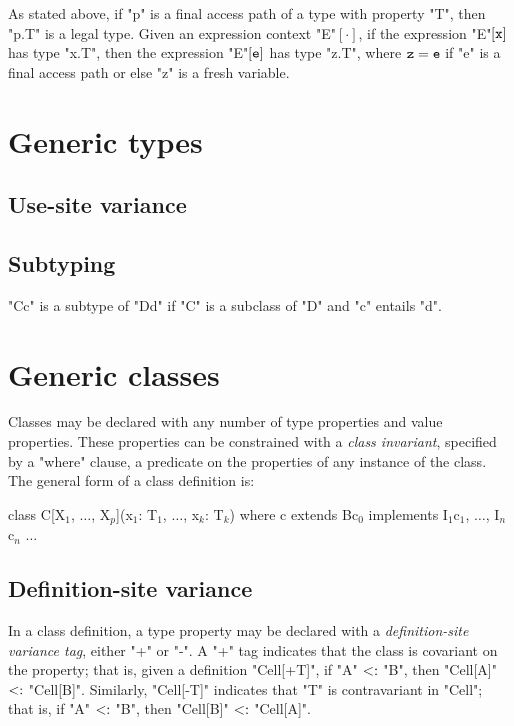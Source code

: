 \documentclass[nocopyrightspace,9pt]{sigplanconf}
\begin{document}
As stated above, if \xcd"p" is a final access path of a
type with property \xcd"T", then \xcd"p.T" is a legal type.
Given an expression context \xcd"E"$[\cdot]$, if
the expression \xcd"E"$[{\tt x}]$ has type \xcd"x.T",
then the expression \xcd"E"$[{\tt e}]$ has type \xcd"z.T",
where ${\tt z} = {\tt e}$ if \xcd"e" is a final access path
or else \xcd"z" is a fresh variable.
\fi

\section{Generic types}

\subsection{Use-site variance}

\subsection{Subtyping}

\xcd"C{c}" is a subtype of \xcd"D{d}" if \xcd"C" is a subclass
of \xcd"D" and \xcd"c" entails \xcd"d".

\section{Generic classes}

Classes may be declared with any number of type properties and
value properties.  These properties can be constrained with a
\emph{class invariant}, specified by a \xcd"where" clause,
a predicate on the properties of any instance of the class.
%
The general form of a class definition is:
\begin{xtenmath}
class C[X$_1$, $\dots$, X$_p$](x$_1$: T$_1$, $\dots$, x$_k$: T$_k$)
      where c
      extends B{c$_0$}
      implements I$_1${c$_1$}, $\dots$, I$_n${c$_n$} {$\dots$}
\end{xtenmath}

\subsection{Definition-site variance}

In a class definition, 
a type property may be declared with a \emph{definition-site variance tag}, either \xcd"+" or
\xcd"-".  A \xcd"+" tag indicates that the class is covariant on
the property; that is, given a definition
\xcd"Cell[+T]",
if \xcd"A" $\subtype$ \xcd"B", then
\xcd"Cell[A]" $\subtype$ \xcd"Cell[B]".
Similarly,
\xcd"Cell[-T]" indicates that \xcd"T" is contravariant in \xcd"Cell";
that is, if \xcd"A" $\subtype$ \xcd"B", then
\xcd"Cell[B]" $\subtype$ \xcd"Cell[A]".
\end{document}
